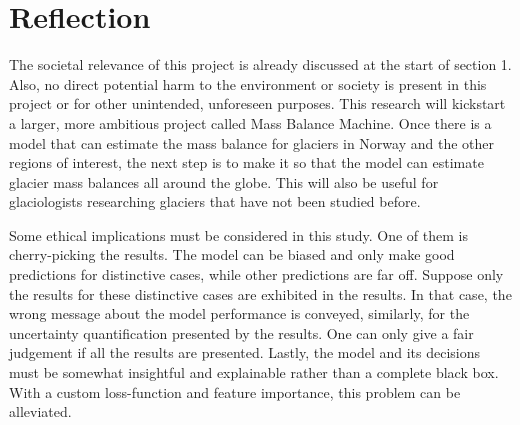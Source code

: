 \section{Reflection}

The societal relevance of this project is already discussed at the start of section 1. Also, no direct potential harm to the environment or society is present in this project or for other unintended, unforeseen purposes. This research will kickstart a larger, more ambitious project called Mass Balance Machine. Once there is a model that can estimate the mass balance for glaciers in Norway and the other regions of interest, the next step is to make it so that the model can estimate glacier mass balances all around the globe. This will also be useful for glaciologists researching glaciers that have not been studied before. 

Some ethical implications must be considered in this study. One of them is cherry-picking the results. The model can be biased and only make good predictions for distinctive cases, while other predictions are far off. Suppose only the results for these distinctive cases are exhibited in the results. In that case, the wrong message about the model performance is conveyed, similarly, for the uncertainty quantification presented by the results. One can only give a fair judgement if all the results are presented. Lastly, the model and its decisions must be somewhat insightful and explainable rather than a complete black box. With a custom loss-function and feature importance, this problem can be alleviated. 
